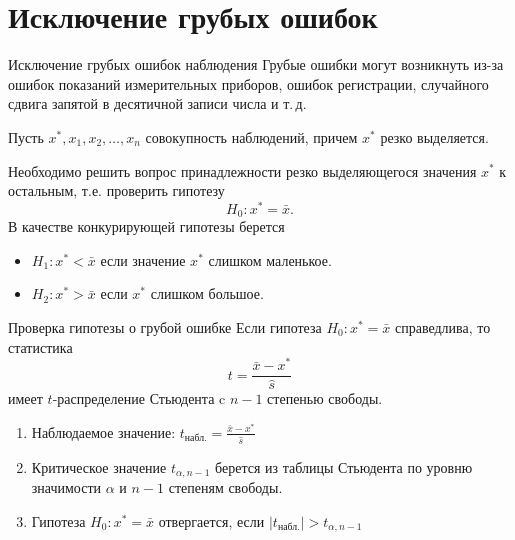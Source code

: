 \documentclass[unicode,11pt,notheorems,xcolor=table]{beamer}
\begin{document}
\section{Исключение грубых ошибок}

\begin{frame}{Исключение грубых ошибок наблюдения}{}
    Грубые ошибки могут возникнуть из-за ошибок показаний измерительных приборов, ошибок регистрации, случайного сдвига запятой в десятичной записи числа и т.\,д.

    \medskip
    Пусть $x^*,x_1,x_2,\ldots, x_n$ совокупность наблюдений,  причем $x^*$ резко  выделяется.  

    \medskip
    Необходимо  решить  вопрос принадлежности резко выделяющегося значения $x^*$ к остальным, т.е. проверить гипотезу
    $$
        H_0\colon x^*=\bar{x}.
    $$
    В качестве конкурирующей гипотезы берется 
    \begin{itemize}
        \item $H_1\colon x^* < \bar{x}$ если значение $x^*$ слишком маленькое.
        \item $H_2 \colon x^* > \bar{x}$ если $x^*$ слишком большое.
    \end{itemize}
\end{frame}


\begin{frame}{Проверка гипотезы о грубой ошибке}{}
    Если гипотеза $H_0\colon x^*=\bar{x}$ справедлива, то статистика 
    $$
        t=\frac{\bar{x}-x^*}{\hat{s}}
    $$
    имеет $t$-распределение Стьюдента c $n-1$ степенью свободы.

    \bigskip

    \begin{enumerate}
        \item Наблюдаемое значение: $t_\text{набл.}=\frac{\bar{x}-x^*}{\hat{s}}$
        \item Критическое значение $t_{\alpha,n-1}$ берется из таблицы Стьюдента по уровню значимости $\alpha$ и $n-1$ степеням свободы.
        \item Гипотеза $H_0\colon x^*=\bar{x}$ отвергается, если $|t_\text{набл.}|> t_{\alpha,n-1}$
    \end{enumerate}
\end{frame}
\end{document}
